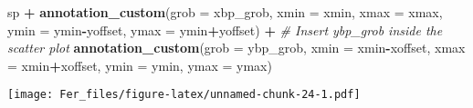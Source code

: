 \documentclass[
]{article}
\newenvironment{Shaded}{\begin{snugshade}}{\end{snugshade}}
\newcommand{\AttributeTok}[1]{\textcolor[rgb]{0.13,0.29,0.53}{#1}}
\newcommand{\CommentTok}[1]{\textcolor[rgb]{0.56,0.35,0.01}{\textit{#1}}}
\newcommand{\FunctionTok}[1]{\textcolor[rgb]{0.13,0.29,0.53}{\textbf{#1}}}
\newcommand{\NormalTok}[1]{#1}
\newcommand{\SpecialCharTok}[1]{\textcolor[rgb]{0.81,0.36,0.00}{\textbf{#1}}}
\begin{document}
\begin{Shaded}
\begin{Highlighting}[]
\NormalTok{sp }\SpecialCharTok{+} \FunctionTok{annotation\_custom}\NormalTok{(}\AttributeTok{grob =}\NormalTok{ xbp\_grob, }\AttributeTok{xmin =}\NormalTok{ xmin, }\AttributeTok{xmax =}\NormalTok{ xmax, }
                       \AttributeTok{ymin =}\NormalTok{ ymin}\SpecialCharTok{{-}}\NormalTok{yoffset, }\AttributeTok{ymax =}\NormalTok{ ymin}\SpecialCharTok{+}\NormalTok{yoffset) }\SpecialCharTok{+}
  \CommentTok{\# Insert ybp\_grob inside the scatter plot}
  \FunctionTok{annotation\_custom}\NormalTok{(}\AttributeTok{grob =}\NormalTok{ ybp\_grob,}
                    \AttributeTok{xmin =}\NormalTok{ xmin}\SpecialCharTok{{-}}\NormalTok{xoffset, }\AttributeTok{xmax =}\NormalTok{ xmin}\SpecialCharTok{+}\NormalTok{xoffset, }
                    \AttributeTok{ymin =}\NormalTok{ ymin, }\AttributeTok{ymax =}\NormalTok{ ymax)}
\end{Highlighting}
\end{Shaded}

\texttt{[image: Fer\_files/figure-latex/unnamed-chunk-24-1.pdf]}
\end{document}
